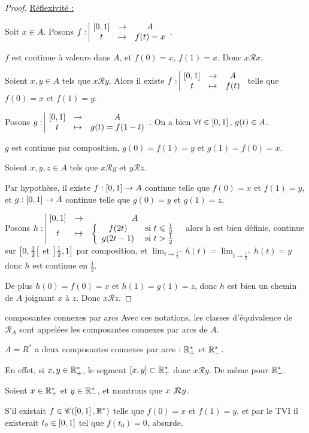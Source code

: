 \begin{proof}
    \uline{Réflexivité :}

    \svspace Soit $x \in A$. Posons $f: \space \begin{array}{|ccc} \displaystyle \left[0, 1\right] & \to & \displaystyle A \\ \displaystyle t & \mapsto & \displaystyle f(t) = x \end{array}$. 

    $f$ est continue à valeurs dans $A$, et $f(0) = x$, $f(1) = x$. Donc $x \mathcal R x$.


    \svspace Soient $x, y \in A$ tels que $x \mathcal R y$. Alors il existe $f: \space \begin{array}{|ccc} \displaystyle \left[0, 1\right] & \to & \displaystyle A \\ \displaystyle t & \mapsto & \displaystyle f(t) \end{array}$
    telle que $f(0) = x$ et $f(1) = y$.

    Posons $g: \space \begin{array}{|ccc} \displaystyle \left[0, 1\right] & \to & \displaystyle A \\ \displaystyle t & \mapsto & \displaystyle g(t) = f(1 - t) \end{array}$. On a bien $\forall t \in \left[0, 1\right], \, g(t) \in A$. 

    $g$ est continue par composition, $g(0) = f(1) = y$ et $g(1) = f(0) = x$. 


    \svspace Soient $x, y, z \in A$ tels que $x \mathcal R y$ et $y \mathcal R z$.

    Par hypothèse, il existe $f : \left[0, 1\right] \to A$ continue telle que $f(0) = x$ et $f(1) = y$, 
    et $g : \left[0, 1\right] \to A$ continue telle que $g(0) = y$ et $g(1) = z$.

    Posons $h: \space \begin{array}{|ccc} \displaystyle \left[0, 1\right] & \to & \displaystyle A \\ \displaystyle t & \mapsto & \displaystyle  \left\{ \begin{array}{cc} 
        f(2t) & \text{ si } t \leqslant \frac 1 2 \\
        g(2t - 1) & \text{ si } t > \frac 1 2
    \end{array} \right.  \end{array}$ alors h est bien définie, continue sur $\left[0, \frac 1 2\right[$ et $\left]\frac 1 2, 1\right]$ par 
    composition, et $\displaystyle \lim_{t \to \frac 1 2^-} h(t) = \lim_{t \to \frac 1 2^+} h(t) = y$ donc $h$ est continue en $\frac 1 2$.

    De plus $h(0) = f(0) = x$ et $h(1) = g(1) = z$, donc $h$ est bien un chemin de 
    $A$ joignant $x$ à $z$. Donc $x \mathcal R z$.
\end{proof}

\begin{definition}{composantes connexes par arcs }{}
    Avec ces notations, les classes d'équivalence de $\mathcal R_A$ sont appelées 
    les composantes connexes par arcs de $A$.
\end{definition}

\begin{exemple}
    $A = R^*$ a deux composantes connexes par arcs : $\mathbb{R}_+^*$ et $\mathbb{R}_-^*$.

    En effet, si $x, y \in \mathbb{R}_+^*$, le segment $[x, y] \subset \mathbb{R}_+^*$ donc $x \mathcal R y$.
    De même pour $\mathbb{R}_-^*$.

    Soient $x \in \mathbb{R}_+^*$ et $y \in \mathbb{R}_-^*$, et montrons que $x \not\mathcal R y$.

    S'il existait $f \in \mathscr C(\left[0, 1\right], \mathbb{R}^*)$ telle que $f(0) = x$ et $f(1) = y$,
    et par le TVI il existerait $t_0 \in \left[0, 1\right]$ tel que $f(t_0) = 0$, absurde.
\end{exemple}

